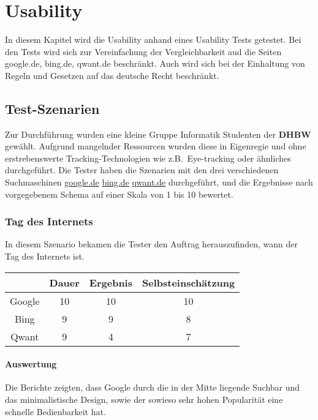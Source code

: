 \chapter{Usability}\label{ch:usability}

In diesem Kapitel wird die Usability anhand eines Usability Tests getestet.
Bei den Tests wird sich zur Vereinfachung der Vergleichbarkeit aud die Seiten google.de, bing.de, qwant.de beschränkt.
Auch wird sich bei der Einhaltung von Regeln und Gesetzen auf das deutsche Recht beschränkt.

\section{Test-Szenarien}\label{sec:szenarien}
Zur Durchführung wurden eine kleine Gruppe Informatik Studenten der \textbf{DHBW} gewählt.
Aufgrund mangelnder Ressourcen wurden diese in Eigenregie und ohne erstrebenswerte Tracking-Technologien wie z.B.\ Eye-tracking oder ähnliches durchgeführt.
Die Tester haben die Szenarien mit den drei verschiedenen Suchmaschinen \url{google.de} \url{bing.de} \url{qwant.de} durchgeführt,
und die Ergebnisse nach vorgegebenem Schema auf einer Skala von 1 bis 10 bewertet.

\subsection{Tag des Internets}\label{subsec:szenario1}
In diesem Szenario bekamen die Tester den Auftrag herauszufinden, wann der Tag des Internets ist.

\begin{tabular}{|c|c|c|c|}
    \hline
    & Dauer & Ergebnis & Selbsteinschätzung \\
    \hline
    Google & 10    & 10       & 10                 \\
    \hline
    Bing   & 9     & 9        & 8                  \\
    \hline
    Qwant  & 9     & 4        & 7                  \\
    \hline
\end{tabular}

\subsubsection*{Auswertung}
Die Berichte zeigten, dass Google durch die in der Mitte liegende Suchbar und das minimalistische Design,
sowie der sowieso sehr hohen Popularität eine schnelle Bedienbarkeit hat.\\

